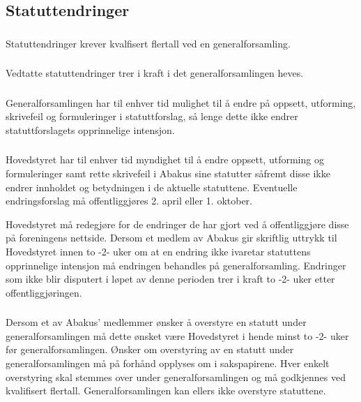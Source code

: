 \subsection{Statuttendringer}
\subsubsection{}
Statuttendringer krever kvalfisert flertall ved en generalforsamling.

\subsubsection{}
Vedtatte statuttendringer trer i kraft i det generalforsamlingen heves.

\subsubsection{}
Generalforsamlingen har til enhver tid mulighet til å endre på oppsett,
utforming, skrivefeil og formuleringer i statuttforslag, så lenge dette ikke
endrer statuttforslagets opprinnelige intensjon.

\subsubsection{}
Hovedstyret har til enhver tid myndighet til å endre oppsett, utforming og
formuleringer samt rette skrivefeil i Abakus sine statutter såfremt disse ikke
endrer innholdet og betydningen i de aktuelle statuttene. Eventuelle
endringsforslag må offentliggjøres 2. april eller 1. oktober.

Hovedstyret må redegjøre for de endringer de har gjort ved å offentliggjøre
disse på foreningens nettside. Dersom et medlem av Abakus gir skriftlig uttrykk
til Hovedstyret innen to -2- uker om at en endring ikke ivaretar statuttens
opprinnelige intensjon må endringen behandles på generalforsamling. Endringer
som ikke blir disputert i løpet av denne perioden trer i kraft to -2- uker
etter offentliggjøringen.

\subsubsection{}
Dersom et av Abakus' medlemmer ønsker å overstyre en statutt under
generalforsamlingen må dette ønsket være Hovedstyret i hende minst to -2- uker
før generalforsamlingen. Ønsker om overstyring av en statutt under
generalforsamlingen må på forhånd opplyses om i sakspapirene. Hver enkelt
overstyring skal stemmes over under generalforsamlingen og må godkjennes ved
kvalifisert flertall. Generalforsamlingen kan ellers ikke overstyre statuttene.

